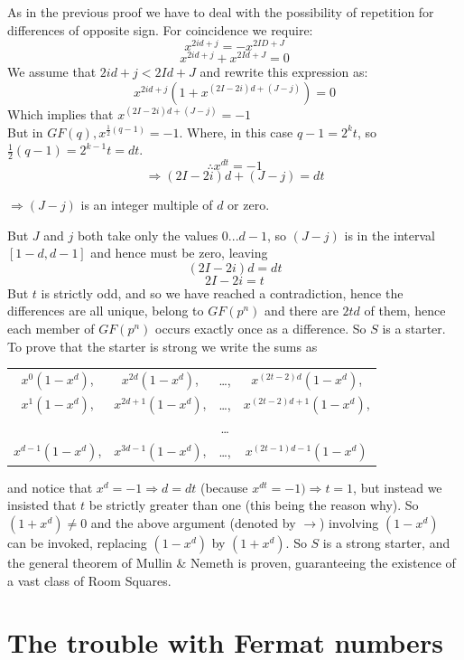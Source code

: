 \documentclass[
  12pt,
  a4paper]{book}
\begin{document}
As in the previous proof we have to deal with the possibility of
repetition for differences of opposite sign. For coincidence we require:
\[x^{2id+j}=-x^{2ID+J}\] \[x^{2id+j}+x^{2Id+J}=0\] We assume that
\(2id+j<2Id+J\) and rewrite this expression as:
\[x^{2id+j}(1+x^{(2I-2i)d+(J-j)})=0\] Which implies that
\(x^{(2I-2i)d+(J-j)}=-1\)\\
But in \(GF(q),x^{\frac{1}{2}(q-1)}=-1\). Where, in this case
\(q-1=2^kt\), so \(\frac{1}{2}(q-1)=2^{k-1}t=dt\).
\[\therefore x^{dt} = -1\] \[\Rightarrow (2I-2i)d+(J-j)=dt\]

\(\Rightarrow (J-j)\) is an integer multiple of \(d\) or zero.

But \(J\) and \(j\) both take only the values \(0...d-1\), so \((J-j)\)
is in the interval \([1-d,d-1]\) and hence must be zero, leaving
\[(2I-2i)d=dt\] \[2I-2i=t\] But \(t\) is strictly odd, and so we have
reached a contradiction, hence the differences are all unique, belong to
\(GF(p^n)\) and there are \(2td\) of them, hence each member of
\(GF(p^n)\) occurs exactly once as a difference. So \(S\) is a
starter.\\
To prove that the starter is strong we write the sums as

\begin{longtable}[]{@{}cccc@{}}
\toprule
\endhead
\(x^0(1-x^d)\), & \(x^{2d}(1-x^d)\), & \ldots, &
\(x^{(2t-2)d}(1-x^d)\),\tabularnewline
\(x^1(1-x^d)\), & \(x^{2d+1}(1-x^d)\), & \ldots, &
\(x^{(2t-2)d+1}(1-x^d)\),\tabularnewline
& & \ldots{} &\tabularnewline
\(x^{d-1}(1-x^d)\), & \(x^{3d-1}(1-x^d)\), & \ldots, &
\(x^{(2t-1)d-1}(1-x^d)\)\tabularnewline
\bottomrule
\end{longtable}

and notice that \(x^d=-1 \Rightarrow d=dt\) (because
\(x^{dt}=-1) \Rightarrow t=1\), but instead we insisted that \(t\) be
strictly greater than one (this being the reason why). So
\((1+x^d) \neq 0\) and the above argument (denoted by \(\rightarrow\))
involving \((1-x^d)\) can be invoked, replacing \((1-x^d)\) by
\((1+x^d)\). So \(S\) is a strong starter, and the general theorem of
Mullin \& Nemeth is proven, guaranteeing the existence of a vast class
of Room Squares.

\hypertarget{the-trouble-with-fermat-numbers}{%
\section{The trouble with Fermat
numbers}\label{the-trouble-with-fermat-numbers}}
\end{document}
